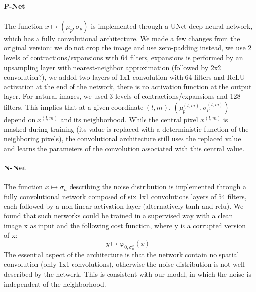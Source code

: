\documentclass{article}
\begin{document}
\paragraph{P-Net}
The function $x\mapsto (\mu_p , \sigma_p)$ is implemented through a UNet \cite{ronneberger2015u} deep neural network, which has a fully convolutional architecture.
We made a few changes from the original version: we do not crop the image and use zero-padding instead, we use 2 levels of contractions/expansions with 64 filters, expansions is performed by an upsampling layer with nearest-neighbor approximation (followed by 2x2 convolution?), we added two layers of 1x1 convolution with 64 filters and ReLU activation at the end of the network, there is no activation function at the output layer.
For natural images, we used 3 levels of contractions/expansions and 128 filters.
This implies that at a given coordinate $(l,m)$, $(\mu_p^{(l,m)}, \sigma_p^{(l,m)})$ depend on $x^{(l,m)}$ and its neighborhood.
While the central pixel $x^{(l,m)}$ is masked during training (its value is replaced with a deterministic function of the neighboring pixels), the convolutional architecture still uses the replaced value and learns the parameters of the convolution associated with this central value.

\paragraph{N-Net}
The function $x\mapsto\sigma_n$ describing the noise distribution is implemented through a fully convolutional network composed of six 1x1 convolutions layers of 64 filters, each followed by a non-linear activation layer (alternatively tanh and relu).
We found that such networks could be trained in a supervised way with a clean image x as input and the following cost function, where y is a corrupted version of x:
$$
y\mapsto\varphi_{0,\sigma_n^2}(x)
$$
The essential aspect of the architecture is that the network contain no spatial convolution (only 1x1 convolutions), otherwise the noise distribution is not well described by the network. This is consistent with our model, in which the noise is independent of the neighborhood.
\end{document}

